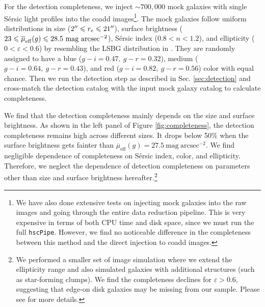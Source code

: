 \documentclass[twocolumn,astrosymb,twocolappendix]{aastex631}
\newcommand{\sbunit}{\mathrm{mag\ arcsec}^{-2}}
\newcommand{\sbeff}{\overline{\mu}_{\mathrm{eff}}(g)}
\newcommand{\code}[1]{\texttt{#1}}
\newcommand{\sersic}{S\'ersic}
\begin{document}
\begin{CJK*}{UTF8}{gbsn}
For the detection completeness, we inject $\sim 700,000$ mock galaxies with single \sersic{} light profiles \citep{Sersic1963} into the coadd images\footnote{We have also done extensive tests on injecting mock galaxies into the raw images and going through the entire data reduction pipeline. This is very expensive in terms of both CPU time and disk space, since we must run the full \code{hscPipe}. However, we find no noticeable difference in the completeness between this method and the direct injection to coadd images.}. The mock galaxies follow uniform distributions in size ($2\mbox{$^{\prime\prime}$} \leqslant r_{e} \leqslant 21\mbox{$^{\prime\prime}$}$), surface brightness ($23 \leqslant \overline{\mu}_{\rm eff}(g) \leqslant 28.5\ \mathrm{mag\ arcsec^{-2}}$), \sersic{} index ($0.8 < n < 1.2$), and ellipticity ($0 < \varepsilon < 0.6$) by resembling the LSBG distribution in . They are randomly assigned to have a blue ($g-i=0.47,\ g-r=0.32$), medium ($g-i=0.64,\ g-r=0.43$), and red ($g-i=0.82,\ g-r=0.56$) color with equal chance. Then we run the detection step as described in Sec. \ref{sec:detection} and cross-match the detection catalog with the input mock galaxy catalog to calculate completeness. 

We find that the detection completeness mainly depends on the size and surface brightness. As shown in the left panel of Figure \ref{fig:completeness}, the detection completeness remains high across different sizes. It drops below 50\% when the surface brightness gets fainter than $\sbeff = 27.5\ \sbunit$. We find negligible dependence of completeness on \sersic{} index, color, and ellipticity. Therefore, we neglect the dependence of detection completeness on parameters other than size and surface brightness hereafter.\footnote{We performed a smaller set of image simulation where we extend the ellipticity range and also simulated galaxies with additional structures (such as star-forming clumps). We find the completeness declines for $\varepsilon > 0.6$, suggesting that edge-on disk galaxies may be missing from our sample. Please see \citet{Greene2022} for more details.}



\end{CJK*}
\end{document}
